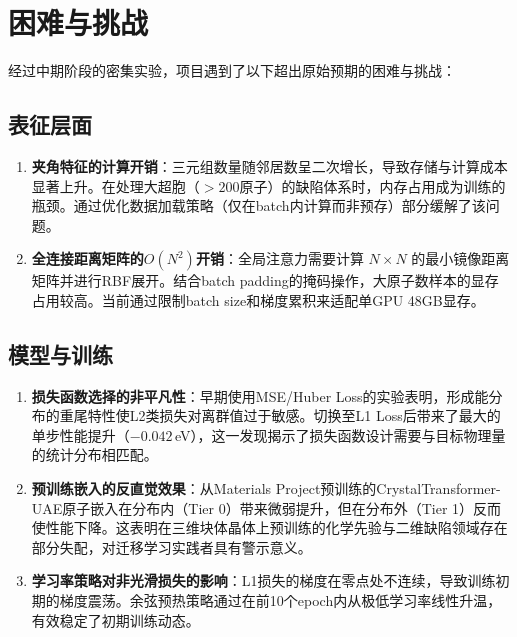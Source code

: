 \section{困难与挑战}

经过中期阶段的密集实验，项目遇到了以下超出原始预期的困难与挑战：

\subsection{表征层面}

\begin{enumerate}
    \item \textbf{夹角特征的计算开销}：三元组数量随邻居数呈二次增长，导致存储与计算成本显著上升。在处理大超胞（$>200$原子）的缺陷体系时，内存占用成为训练的瓶颈。通过优化数据加载策略（仅在batch内计算而非预存）部分缓解了该问题。

    \item \textbf{全连接距离矩阵的$O(N^2)$开销}：全局注意力需要计算 $N \times N$ 的最小镜像距离矩阵并进行RBF展开。结合batch padding的掩码操作，大原子数样本的显存占用较高。当前通过限制batch size和梯度累积来适配单GPU 48GB显存。
\end{enumerate}

\subsection{模型与训练}

\begin{enumerate}
    \item \textbf{损失函数选择的非平凡性}：早期使用MSE/Huber Loss的实验表明，形成能分布的重尾特性使L2类损失对离群值过于敏感。切换至L1 Loss后带来了最大的单步性能提升（$-0.042$\,eV），这一发现揭示了损失函数设计需要与目标物理量的统计分布相匹配。

    \item \textbf{预训练嵌入的反直觉效果}：从Materials Project预训练的CrystalTransformer-UAE原子嵌入在分布内（Tier 0）带来微弱提升，但在分布外（Tier 1）反而使性能下降。这表明在三维块体晶体上预训练的化学先验与二维缺陷领域存在部分失配，对迁移学习实践者具有警示意义。

    \item \textbf{学习率策略对非光滑损失的影响}：L1损失的梯度在零点处不连续，导致训练初期的梯度震荡。余弦预热策略通过在前10个epoch内从极低学习率线性升温，有效稳定了初期训练动态。
\end{enumerate}

